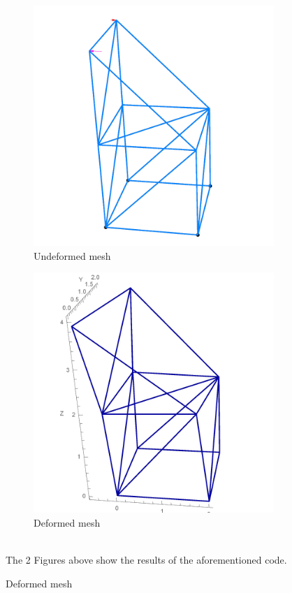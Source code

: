 \begin{figure}
	\begin{subfigure}[b]{0.4\textwidth}
		\includegraphics[width=\textwidth]{figures/undeformed}
		\caption{Undeformed mesh}
		\label{fig:mesh}
	\end{subfigure}
	\begin{subfigure}[b]{0.4\textwidth}
		\includegraphics[width=\textwidth]{figures/deformed}
		\caption{Deformed mesh}
		\label{fig:def_mesh}
	\end{subfigure}
	\\ \vspace{5mm}The 2 Figures above show the results of the aforementioned code.
	
\end{figure}



